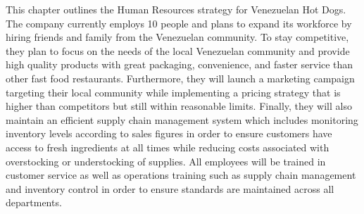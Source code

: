  

This chapter outlines the Human Resources strategy for Venezuelan Hot Dogs. The company currently employs 10 people and plans to expand its workforce by hiring friends and family from the Venezuelan community. To stay competitive, they plan to focus on the needs of the local Venezuelan community and provide high quality products with great packaging, convenience, and faster service than other fast food restaurants. Furthermore, they will launch a marketing campaign targeting their local community while implementing a pricing strategy that is higher than competitors but still within reasonable limits. Finally, they will also maintain an efficient supply chain management system which includes monitoring inventory levels according to sales figures in order to ensure customers have access to fresh ingredients at all times while reducing costs associated with overstocking or understocking of supplies. All employees will be trained in customer service as well as operations training such as supply chain management and inventory control in order to ensure standards are maintained across all departments.